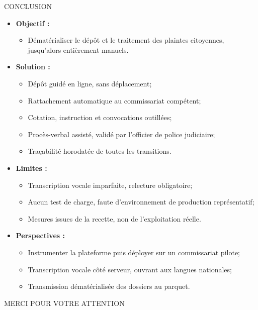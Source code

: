 \documentclass[9pt]{beamer}
\begin{document}
\begin{frame}{CONCLUSION}

\begin{itemize}

    \item \textbf{Objectif : }
    \begin{itemize}
    \item Dématérialiser le dépôt et le traitement des plaintes citoyennes, jusqu'alors entièrement manuels.
    \end{itemize}
    \item \textbf{Solution : }
        \begin{itemize}
  \item Dépôt guidé en ligne, sans déplacement;
  \item Rattachement automatique au commissariat compétent;
  \item Cotation, instruction et convocations outillées;
  \item Procès-verbal assisté, validé par l'officier de police judiciaire;
  \item Traçabilité horodatée de toutes les transitions.
  \end{itemize}
  \item \textbf{Limites : }
     \begin{itemize}
  \item Transcription vocale imparfaite, relecture obligatoire;
  \item Aucun test de charge, faute d'environnement de production représentatif;
  \item Mesures issues de la recette, non de l'exploitation réelle.
  \end{itemize}
\item \textbf{Perspectives : }
    \begin{itemize}
  \item Instrumenter la plateforme puis déployer sur un commissariat pilote;
  \item Transcription vocale côté serveur, ouvrant aux langues nationales;
  \item Transmission dématérialisée des dossiers au parquet.
\end{itemize}
     \end{itemize}

\end{frame}

\begin{frame}{}
   \centering \Large MERCI POUR VOTRE ATTENTION
\end{frame}
\end{document}

